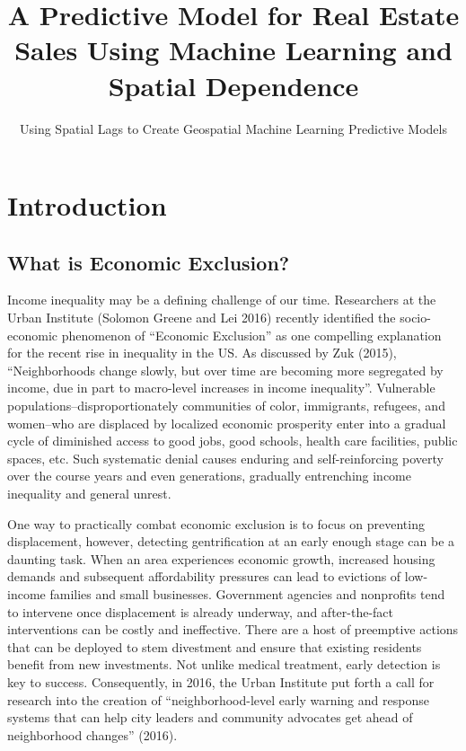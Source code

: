 \documentclass[]{article}
\title{A Predictive Model for Real Estate Sales Using Machine Learning and
Spatial Dependence}
\subtitle{Using Spatial Lags to Create Geospatial Machine Learning Predictive
Models}
\author{}
\date{}
\begin{document}
\maketitle

{
\setcounter{tocdepth}{2}
\tableofcontents
}
\section{Introduction}\label{introduction}

\subsection{What is Economic
Exclusion?}\label{what-is-economic-exclusion}

Income inequality may be a defining challenge of our time. Researchers
at the Urban Institute (Solomon Greene and Lei 2016) recently identified
the socio-economic phenomenon of ``Economic Exclusion'' as one
compelling explanation for the recent rise in inequality in the US. As
discussed by Zuk (2015), ``Neighborhoods change slowly, but over time
are becoming more segregated by income, due in part to macro-level
increases in income inequality''. Vulnerable
populations--disproportionately communities of color, immigrants,
refugees, and women--who are displaced by localized economic prosperity
enter into a gradual cycle of diminished access to good jobs, good
schools, health care facilities, public spaces, etc. Such systematic
denial causes enduring and self-reinforcing poverty over the course
years and even generations, gradually entrenching income inequality and
general unrest.

One way to practically combat economic exclusion is to focus on
preventing displacement, however, detecting gentrification at an early
enough stage can be a daunting task. When an area experiences economic
growth, increased housing demands and subsequent affordability pressures
can lead to evictions of low-income families and small businesses.
Government agencies and nonprofits tend to intervene once displacement
is already underway, and after-the-fact interventions can be costly and
ineffective. There are a host of preemptive actions that can be deployed
to stem divestment and ensure that existing residents benefit from new
investments. Not unlike medical treatment, early detection is key to
success. Consequently, in 2016, the Urban Institute put forth a call for
research into the creation of ``neighborhood-level early warning and
response systems that can help city leaders and community advocates get
ahead of neighborhood changes'' (2016).
\end{document}
